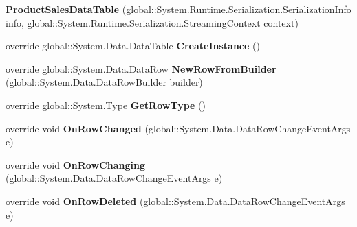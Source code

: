 \begin{DoxyCompactItemize}
\item 
{\bfseries Product\+Sales\+Data\+Table} (global\+::\+System.\+Runtime.\+Serialization.\+Serialization\+Info info, global\+::\+System.\+Runtime.\+Serialization.\+Streaming\+Context context)\hypertarget{class_products_1_1_data_1_1ds_sage_1_1_product_sales_data_table_a2f1316808a1fffa335f0364a246843d8}{}\label{class_products_1_1_data_1_1ds_sage_1_1_product_sales_data_table_a2f1316808a1fffa335f0364a246843d8}

\item 
override global\+::\+System.\+Data.\+Data\+Table {\bfseries Create\+Instance} ()\hypertarget{class_products_1_1_data_1_1ds_sage_1_1_product_sales_data_table_aa8025a1d4a64e169972cca4387badac3}{}\label{class_products_1_1_data_1_1ds_sage_1_1_product_sales_data_table_aa8025a1d4a64e169972cca4387badac3}

\item 
override global\+::\+System.\+Data.\+Data\+Row {\bfseries New\+Row\+From\+Builder} (global\+::\+System.\+Data.\+Data\+Row\+Builder builder)\hypertarget{class_products_1_1_data_1_1ds_sage_1_1_product_sales_data_table_a55957ded705b5a1adb706e71ff1dba69}{}\label{class_products_1_1_data_1_1ds_sage_1_1_product_sales_data_table_a55957ded705b5a1adb706e71ff1dba69}

\item 
override global\+::\+System.\+Type {\bfseries Get\+Row\+Type} ()\hypertarget{class_products_1_1_data_1_1ds_sage_1_1_product_sales_data_table_ab5fb6852d9ccba086edcafa2ed0a1da5}{}\label{class_products_1_1_data_1_1ds_sage_1_1_product_sales_data_table_ab5fb6852d9ccba086edcafa2ed0a1da5}

\item 
override void {\bfseries On\+Row\+Changed} (global\+::\+System.\+Data.\+Data\+Row\+Change\+Event\+Args e)\hypertarget{class_products_1_1_data_1_1ds_sage_1_1_product_sales_data_table_afc67e1b5de1ff7ce4e56255eddf41fd3}{}\label{class_products_1_1_data_1_1ds_sage_1_1_product_sales_data_table_afc67e1b5de1ff7ce4e56255eddf41fd3}

\item 
override void {\bfseries On\+Row\+Changing} (global\+::\+System.\+Data.\+Data\+Row\+Change\+Event\+Args e)\hypertarget{class_products_1_1_data_1_1ds_sage_1_1_product_sales_data_table_a629121a348d78f98a24d6e667772c27d}{}\label{class_products_1_1_data_1_1ds_sage_1_1_product_sales_data_table_a629121a348d78f98a24d6e667772c27d}

\item 
override void {\bfseries On\+Row\+Deleted} (global\+::\+System.\+Data.\+Data\+Row\+Change\+Event\+Args e)\hypertarget{class_products_1_1_data_1_1ds_sage_1_1_product_sales_data_table_aaebac001675271a31e543653ede593c5}{}\label{class_products_1_1_data_1_1ds_sage_1_1_product_sales_data_table_aaebac001675271a31e543653ede593c5}


\end{DoxyCompactItemize}
